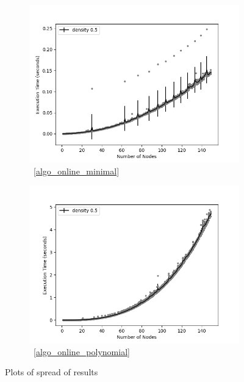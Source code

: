 \documentclass[sigplan,review,nonacm=true]{acmart}
\begin{document}
\begin{figure}
    \begin{subfigure}{\linewidth}
      \includegraphics[width=\linewidth]{variance_10_OptimalSet.png}
      \caption{~\ref{algo_online_minimal}}
      \label{fig:sfigOptimalSpread}
    \end{subfigure}

    \begin{subfigure}{\linewidth}
      \includegraphics[width=\linewidth]{variance_10_Polynomial.png}
      \caption{~\ref{algo_online_polynomial}}
      \label{fig:sfigPolynomialSpread}
    \end{subfigure}
    

    \caption{Plots of spread of results}
    \label{fig:variance}
\end{figure}
\end{document}
